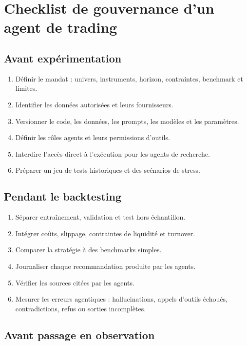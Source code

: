 \chapter{Checklist de gouvernance d'un agent de trading}\label{annexe:checklist}

\section{Avant expérimentation}

\begin{enumerate}
    \item Définir le mandat : univers, instruments, horizon, contraintes, benchmark et limites.
    \item Identifier les données autorisées et leurs fournisseurs.
    \item Versionner le code, les données, les prompts, les modèles et les paramètres.
    \item Définir les rôles agents et leurs permissions d'outils.
    \item Interdire l'accès direct à l'exécution pour les agents de recherche.
    \item Préparer un jeu de tests historiques et des scénarios de stress.
\end{enumerate}

\section{Pendant le backtesting}

\begin{enumerate}
    \item Séparer entraînement, validation et test hors échantillon.
    \item Intégrer coûts, slippage, contraintes de liquidité et turnover.
    \item Comparer la stratégie à des benchmarks simples.
    \item Journaliser chaque recommandation produite par les agents.
    \item Vérifier les sources citées par les agents.
    \item Mesurer les erreurs agentiques : hallucinations, appels d'outils échoués, contradictions, refus ou sorties incomplètes.
\end{enumerate}

\section{Avant passage en observation}

